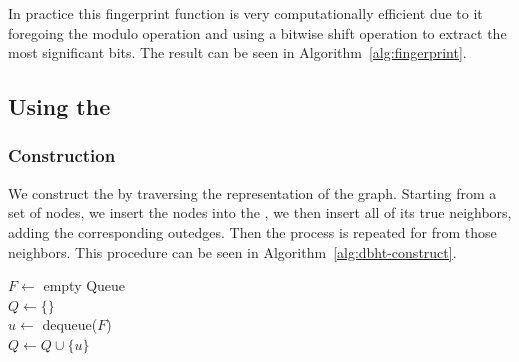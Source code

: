 In practice this fingerprint function is very computationally efficient due to it foregoing the modulo operation and using a bitwise shift operation to extract the most significant bits. The result can be seen in Algorithm~\ref{alg:fingerprint}.

\begin{algorithm}
  \caption{$\mathit{fingerprint(X)}$}\label{alg:fingerprint}
\end{algorithm}

\subsection{Using the \dBHT}

\subsubsection{Construction}
\label{subsubsec:dbht-construction}

We construct the \dBHT by traversing the \dBCM representation of the graph. Starting from a set of nodes, we insert the nodes into the \dBHT, we then insert all of its true neighbors, adding the corresponding outedges. Then the process is repeated for from those neighbors. This procedure can be seen in Algorithm~\ref{alg:dbht-construct}.

\begin{algorithm}
	\caption{$T.\mathit{construct}(C)$}\label{alg:dbht-construct}
  $F \gets$ empty Queue\\
  $Q \gets \{\}$\\
   {
    $u \gets$ dequeue($F$)\\
    $Q \gets Q \cup \{u\}$\\
  }
\end{algorithm}

